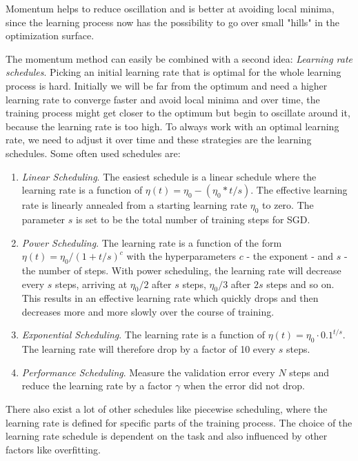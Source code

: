 Momentum helps to reduce oscillation and is better at avoiding local minima, since the learning process now has the possibility to go over small "hills" in the optimization surface.

The momentum method can easily be combined with a second idea: \textit{Learning rate schedules}. Picking an initial learning rate that is optimal for the whole learning process is hard. Initially we will be far from the optimum and need a higher learning rate to converge faster and avoid local minima and over time, the training process might get closer to the optimum but begin to oscillate around it, because the learning rate is too high. To always work with an optimal learning rate, we need to adjust it over time and these strategies are the learning schedules. Some often used schedules are:

\begin{enumerate}
  \item \textit{Linear Scheduling}. The easiest schedule is a linear schedule where the learning rate is a function of $\eta(t) = \eta_0 - (\eta_0 * t/s)$. The effective learning rate is linearly annealed from a starting learning rate $\eta_0$ to zero. The parameter $s$ is set to be the total number of training steps for SGD.
  \item \textit{Power Scheduling}. The learning rate is a function of the form $\eta(t) = \eta_0 / (1 + t/s)^c$ with the hyperparameters $c$ - the exponent - and $s$ - the number of steps. With power scheduling, the learning rate will decrease every $s$ steps, arriving at $\eta_0 / 2$ after $s$ steps, $\eta_0 / 3$ after $2s$ steps and so on. This results in an effective learning rate which quickly drops and then decreases more and more slowly over the course of training.
  \item \textit{Exponential Scheduling}. The learning rate is a function of $\eta(t) = \eta_0 \cdot 0.1^{t/s}$. The learning rate will therefore drop by a factor of 10 every $s$ steps.
  \item \textit{Performance Scheduling}. Measure the validation error every $N$ steps and reduce the learning rate by a factor $\gamma$ when the error did not drop. 
\end{enumerate}

There also exist a lot of other schedules like piecewise scheduling, where the learning rate is defined for specific parts of the training process. The choice of the learning rate schedule is dependent on the task and also influenced by other factors like overfitting.

